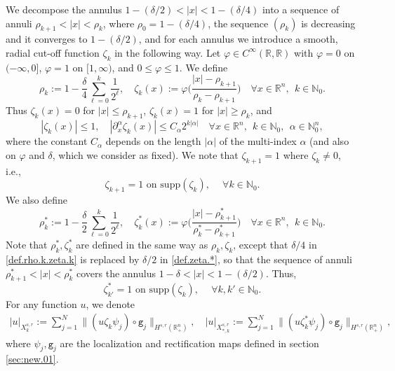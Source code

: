 \documentclass[10pt,reqno,a4paper]{article}
\numberwithin{equation}{section}
\theoremstyle{plain}
\theoremstyle{definition}
\newcommand{\N}{{\mathbb N}}
\newcommand{\R}{{\mathbb R}}
\newcommand{\ph}{\varphi}
\newcommand{\pa}{\partial}
\begin{document}
We decompose the annulus $1 - (\delta/2) < |x| < 1 - (\delta/4)$ 
into a sequence of annuli $\rho_{k+1} < |x| < \rho_k$, 
where $\rho_0 = 1 - (\delta/4)$, 
the sequence $(\rho_k)$ is decreasing and it converges to $1-(\delta/2)$,
and for each annulus we introduce a smooth, radial cut-off function $\zeta_k$ 
in the following way. 
Let $\ph \in C^\infty(\R, \R)$ with 
$\ph = 0$ on $(-\infty, 0]$, 
$\ph = 1$ on $[1, \infty)$, 
and $0 \leq \ph \leq 1$. 
We define 
\begin{equation}  \label{def.rho.k.zeta.k}
\rho_k := 1 - \frac{\delta}{4} \sum_{\ell=0}^k \frac{1}{2^\ell}, 
\quad 
\zeta_k(x) := \ph \Big( \frac{|x| - \rho_{k+1}}{\rho_k - \rho_{k+1}} \Big)
\quad \forall x \in \R^n, \ \ k \in \N_0.
\end{equation}
Thus $\zeta_k(x) = 0$ for $|x| \leq \rho_{k+1}$,
$\zeta_k(x) = 1$ for $|x| \geq \rho_k$, and 
\begin{equation}  \label{est.der.zeta.k}
|\zeta_k(x)| \leq 1, \quad 
| \pa_x^\alpha \zeta_k(x)| 
\leq C_\alpha 2^{k |\alpha|} 
\quad \forall x \in \R^n, \ \  k \in \N_0, \ \ \alpha \in \N_0^n,
\end{equation}
where the constant $C_\alpha$ depends on the length $|\alpha|$ of the multi-index $\alpha$
(and also on $\ph$ and $\delta$, which we consider as fixed). 
We note that $\zeta_{k+1} = 1$ where $\zeta_k \neq 0$, i.e., 
\begin{equation} \label{zeta.k.is.1.where}
\zeta_{k+1} = 1 \text{ on } \mathrm{supp}(\zeta_k), 
\quad \ \forall k \in \N_0.
\end{equation}
We also define 
\begin{equation} \label{def.zeta.*}
\rho_k^* := 1 - \frac{\delta}{2} \sum_{\ell=0}^k \frac{1}{2^\ell}, 
\quad 
\zeta_k^*(x) := \ph \Big( \frac{|x| - \rho^*_{k+1}}{\rho^*_k - \rho^*_{k+1}} \Big)
\quad \forall x \in \R^n, \ \ k \in \N_0.
\end{equation}
Note that $\rho_k^*, \zeta_k^*$ are defined in the same way as $\rho_k, \zeta_k$, 
except that $\delta/4$ in \eqref{def.rho.k.zeta.k} 
is replaced by $\delta/2$ in \eqref{def.zeta.*}, 
so that the sequence of annuli $\rho^*_{k+1} < |x| < \rho^*_k$ 
covers the annulus $1 - \delta < |x| < 1 - (\delta/2)$. 
Thus, 
\begin{equation} \label{zeta.*.k.k'}
\zeta^*_{k'} = 1 \text{ on } \mathrm{supp}(\zeta_k), 
\quad \ \forall k, k' \in \N_0.
\end{equation}
For any function $u$, we denote 
\begin{align} \label{def.seminorm}
|u|_{X^{s,r}_k} := \sum_{j=1}^N \| (u \zeta_k \psi_j) \circ \mathtt g_j \|_{H^{s,r}(\R^n_+)},
\quad 
|u|_{X^{s,r}_{*,k}} := \sum_{j=1}^N \| (u \zeta^*_k \psi_j) \circ \mathtt g_j \|_{H^{s,r}(\R^n_+)},
\end{align}
where $\psi_j, \mathtt g_j$ are the localization and rectification maps defined in section \ref{sec:new.01}.
\end{document}
